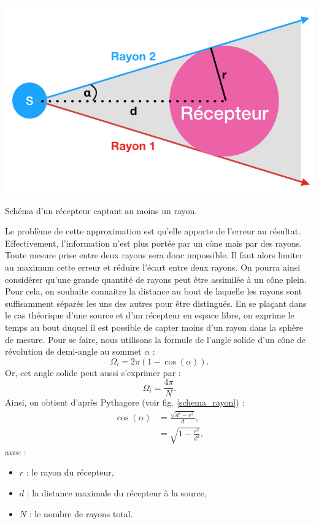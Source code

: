 %
\begin{figureth}
	\includegraphics[width=0.7\linewidth]{images/schema_rayon}
	\caption{Schéma d'un récepteur captant au moins un rayon.}
	\label{schema_rayon}
\end{figureth}
%
 Le problème de cette approximation est qu'elle apporte de l'erreur au résultat. Effectivement, l'information n'est plus portée par un cône mais par des rayons. Toute mesure prise entre deux rayons sera donc impossible. Il faut alors limiter au maximum cette erreur et réduire l'écart entre deux rayons. On pourra ainsi considérer qu'une grande quantité de rayons peut être assimilée à un cône plein. Pour cela, on souhaite connaitre la distance au bout de laquelle les rayons sont suffisamment séparés les uns des autres pour être distingués. En se plaçant dans le cas théorique d'une source et d'un récepteur en espace libre, on exprime le temps au bout duquel il est possible de capter moins d'un rayon dans la sphère de mesure. Pour se faire, nous utilisons la formule de l'angle solide d'un cône de révolution \cite[Angle solide d'un cône de révolution]{cone} de demi-angle au sommet $\alpha$ :
\begin{equation}
	\Omega_i = 2\pi(1-\cos(\alpha)).
\end{equation}
%
Or, cet angle solide peut aussi s'exprimer par :
\begin{equation}
	\Omega_i = \frac{4\pi}{N}.
\end{equation}
%
Ainsi, on obtient d'après Pythagore (voir fig. \ref{schema_rayon}) :
\begin{align}
	\cos(\alpha) & =  \frac{\sqrt{d^2-r^2}}{d}, \nonumber \\
	& =  \sqrt{1-\frac{r^2}{d^2}},
\end{align}
avec  :
\begin{itemize}
\item $r$ : le rayon du récepteur,
\item $d$ : la distance maximale du récepteur à la source,
\item $N$ : le nombre de rayons total.
\end{itemize}
